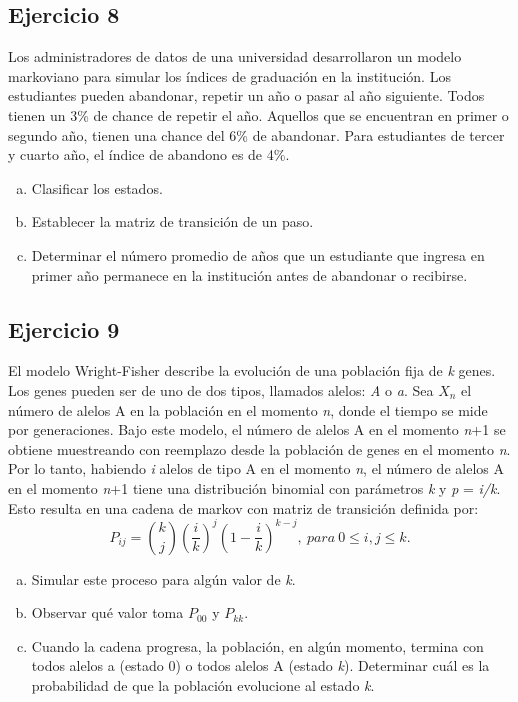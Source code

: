 \documentclass[12pt, a4paper]{article}
\begin{document}
\subsection*{Ejercicio 8}
Los administradores de datos de una universidad desarrollaron un modelo markoviano para simular los índices de graduación en la institución. Los estudiantes pueden abandonar, repetir un año o pasar al año siguiente. Todos tienen un 3\% de chance de repetir el año.  Aquellos que se encuentran en primer o segundo año, tienen una chance del 6\% de abandonar. Para estudiantes de tercer y cuarto año, el índice de abandono es de 4\%. 
\begin{enumerate}[(a)]
	\item Clasificar los estados.
	\item  Establecer la matriz de transición de un paso.
	\item Determinar el número promedio de años que un estudiante que ingresa en primer año permanece en la institución antes de abandonar o recibirse.
 \end{enumerate}

\subsection*{Ejercicio 9}
El modelo Wright-Fisher describe la evolución de una población fija de \textit{k} genes. Los genes pueden ser de uno de dos tipos, llamados alelos: \textit{A} o \textit{a}. Sea $X_n$ el número de alelos A en la población en el momento \textit{n}, donde el tiempo se mide por generaciones. Bajo este modelo, el número de alelos A en el momento \textit{n}+1 se obtiene muestreando con reemplazo desde la población de genes en el momento \textit{n}. Por lo tanto, habiendo \textit{i} alelos de tipo A en el momento \textit{n}, el número de alelos A en el momento \textit{n}+1 tiene una distribución binomial con parámetros \textit{k} y \textit{p} = \textit{i/k}. Esto resulta en una cadena de markov con matriz de transición definida por:
\begin{equation}
P_{ij} = \binom{k}{j} (\dfrac{i}{k})^j (1-\dfrac{i}{k})^{k-j}, \ para \ 0\leq i, j\leq k.
\end{equation}
\begin{enumerate}[(a)]
	\item Simular este proceso para algún valor de \textit{k}.
	\item  Observar qué valor toma $P_{00}$ y $P_{kk}$.
	\item Cuando la cadena progresa, la población, en algún momento, termina con todos alelos a (estado 0) o todos alelos A (estado \textit{k}). Determinar cuál es la probabilidad de que la población evolucione al estado \textit{k}.
 \end{enumerate}
\end{document}
